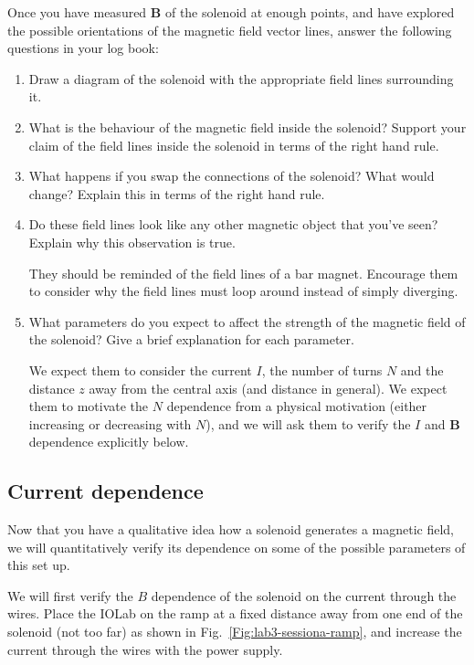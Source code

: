 \documentclass[12pt]{report}
\begin{document}
Once you have measured $\mathbf{B}$ of the solenoid at enough points, and have explored the possible orientations of the magnetic field vector lines, {\color{blue}answer the following questions in your log book:}
\begin{enumerate}
\item Draw a diagram of the solenoid with the appropriate field lines surrounding it.

\item What is the behaviour of the magnetic field inside the solenoid? Support your claim of the field lines inside the solenoid in terms of the right hand rule.
\item What happens if you swap the connections of the solenoid? What would change? Explain this in terms of the right hand rule.
\item Do these field lines look like any other magnetic object that you've seen? Explain why this observation is true.

\begin{tcolorbox}
They should be reminded of the field lines of a bar magnet. Encourage them to consider why the field lines must loop around instead of simply diverging.
\end{tcolorbox}

\item What parameters do you expect to affect the strength of the magnetic field of the solenoid? Give a brief explanation for each parameter.

\begin{tcolorbox}
We expect them to consider the current $I$, the number of turns $N$ and the distance $z$ away from the central axis (and distance in general). We expect them to motivate the $N$ dependence from a physical motivation (either increasing or decreasing with $N$), and we will ask them to verify the $I$ and $\textbf{B}$ dependence explicitly below.
\end{tcolorbox}

\end{enumerate}

\subsection{Current dependence}
Now that you have a qualitative idea how a solenoid generates a magnetic field, we will quantitatively verify its dependence on some of the possible parameters of this set up.

We will first verify the $B$ dependence of the solenoid on the current through the wires. Place the IOLab on the ramp at a fixed distance away from one end of the solenoid (not too far) as shown in Fig.~\ref{Fig:lab3-sessiona-ramp}, and increase the current through the wires with the power supply. 
\end{document}
